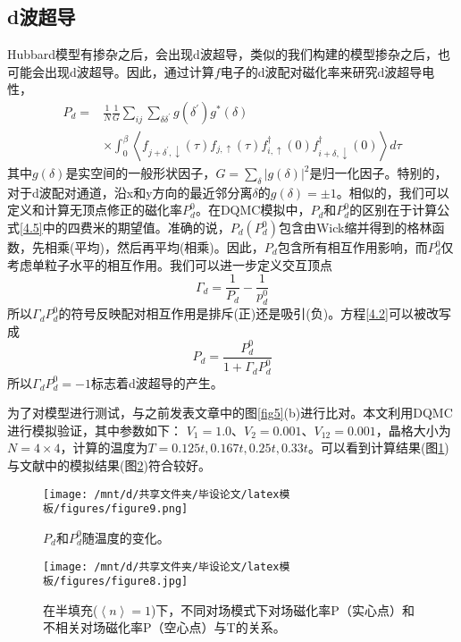 \subsection{d波超导}
Hubbard模型有掺杂之后，会出现d波超导，类似的我们构建的模型掺杂之后，也可能会出现d波超导。因此，通过计算$f$电子的d波配对磁化率来研究d波超导电性，
\begin{equation}
    \begin{aligned}
    P_{d}=& \frac{1}{N} \frac{1}{G} \sum_{i j} \sum_{\delta \delta^{\prime}} g\left(\delta^{\prime}\right) g^{*}(\delta) \\
    & \times \int_{0}^{\beta}\left\langle f_{j+\delta^{\prime}, \downarrow}(\tau) f_{j, \uparrow}(\tau) f_{i, \uparrow}^{\dagger}(0) f_{i+\delta, \downarrow}^{\dagger}(0)\right\rangle d \tau
    \label{4.5}
    \end{aligned}
\end{equation}
其中$g(\delta)$是实空间的一般形状因子，$G=\sum_\delta |g(\delta)|^2$是归一化因子。特别的，对于d波配对通道，沿x和y方向的最近邻分离$\delta$的$g(\delta)=\pm 1$。相似的，我们可以定义和计算无顶点修正的磁化率$P^0_d$。在DQMC模拟中，$P_d$和$P^0_d$的区别在于计算公式\ref{4.5}中的四费米的期望值。准确的说，$P_d(P^0_d)$包含由Wick缩并得到的格林函数，先相乘(平均)，然后再平均(相乘)。因此，$P_d$包含所有相互作用影响，而$P^0_d$仅考虑单粒子水平的相互作用。我们可以进一步定义交互顶点
\begin{equation}
    \Gamma_d=\frac{1}{P_d}-\frac{1}{p^0_d}
    \label{4.2}
\end{equation}
所以$\Gamma_d P^0_d$的符号反映配对相互作用是排斥(正)还是吸引(负)。方程\ref{4.2}可以被改写成
\begin{equation}
    P_d=\frac{P^0_d}{1+\Gamma_d P^0_d}
\end{equation}
所以$\Gamma_d P^0_d=-1$标志着d波超导的产生。


为了对模型进行测试，与之前发表文章中的图\ref{fig5}(b)进行比对。本文利用DQMC进行模拟验证，其中参数如下：
$V_1=1.0$、$V_{2}=0.001$、$V_{12}=0.001$，晶格大小为$N=4 \times 4$，计算的温度为$T=0.125t, 0.167t, 0.25t, 0.33t$。可以看到计算结果(图\ref{fig9})与文献中的模拟结果(图\ref{fig8})符合较好。

\begin{figure}[h]
    \centering
    \texttt{[image: /mnt/d/共享文件夹/毕设论文/latex模板/figures/figure9.png]}
    \caption{$P_d$和$P_d^0$随温度的变化。}
    \label{fig9}
\end{figure}

\begin{figure}[h]
    \centering
    \texttt{[image: /mnt/d/共享文件夹/毕设论文/latex模板/figures/figure8.jpg]}
    \caption{在半填充($\left \langle n \right \rangle=1$)下，不同对场模式下对场磁化率P（实心点）和不相关对场磁化率P（空心点）与T的关系\cite{11}。}
    \label{fig8}
\end{figure}




























